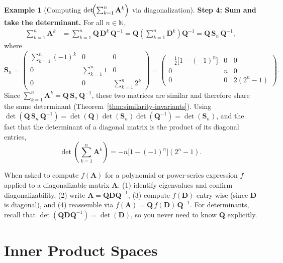 \documentclass[11pt, a4paper, notitlepage]{report}
\theoremstyle{definition}
\newtheorem{example}[theorem]{Example}
\theoremstyle{remark}
\begin{document}
\begin{example}[Computing $\det\!\Bigl(\sum_{k=1}^n \mathbf{A}^k\Bigr)$ via diagonalization]
\medskip
\textbf{Step 4: Sum and take the determinant.}
For all $n \in \mathbb{N}$,
\begin{align*}
  \sum_{k=1}^{n} \mathbf{A}^k
  &= \sum_{k=1}^{n} \mathbf{Q}\,\mathbf{D}^k\,\mathbf{Q}^{-1}
   = \mathbf{Q} \!\left(\sum_{k=1}^{n} \mathbf{D}^k\right)\! \mathbf{Q}^{-1}
   = \mathbf{Q}\,\mathbf{S}_n\,\mathbf{Q}^{-1},
\end{align*}
where
\[
  \mathbf{S}_n
  = \begin{pmatrix}
      \displaystyle\sum_{k=1}^{n}(-1)^k & 0 & 0 \\[6pt]
      0 & \displaystyle\sum_{k=1}^{n}1 & 0 \\[6pt]
      0 & 0 & \displaystyle\sum_{k=1}^{n}2^k
    \end{pmatrix}
  = \begin{pmatrix}
      -\tfrac{1}{2}\bigl[1-(-1)^n\bigr] & 0 & 0 \\[4pt]
      0 & n & 0 \\[4pt]
      0 & 0 & 2(2^n - 1)
    \end{pmatrix}.
\]
Since $\sum_{k=1}^{n} \mathbf{A}^k = \mathbf{Q}\,\mathbf{S}_n\,\mathbf{Q}^{-1}$, these two
matrices are similar and therefore share the same determinant
(Theorem~\ref{thm:similarity-invariants}).  Using
$\det(\mathbf{Q}\,\mathbf{S}_n\,\mathbf{Q}^{-1}) = \det(\mathbf{Q})\det(\mathbf{S}_n)\det(\mathbf{Q}^{-1}) = \det(\mathbf{S}_n)$,
and the fact that the determinant of a diagonal matrix is the product of its diagonal entries,
\[
  \boxed{\det\!\left(\sum_{k=1}^{n}\mathbf{A}^k\right)
  = -n\bigl[1-(-1)^n\bigr](2^n-1).}
\]
\end{example}

\begin{examtip}[title={Exam Tip: Diagonalization for Matrix Powers and Sums}]
When asked to compute $f(\mathbf{A})$ for a polynomial or power-series expression $f$ applied
to a diagonalizable matrix $\mathbf{A}$: (1) identify eigenvalues and confirm diagonalizability,
(2) write $\mathbf{A} = \mathbf{Q}\mathbf{D}\mathbf{Q}^{-1}$, (3) compute $f(\mathbf{D})$
entry-wise (since $\mathbf{D}$ is diagonal), and (4) reassemble via $f(\mathbf{A}) = \mathbf{Q}\,f(\mathbf{D})\,\mathbf{Q}^{-1}$.
For determinants, recall that $\det(\mathbf{Q}\mathbf{D}\mathbf{Q}^{-1}) = \det(\mathbf{D})$,
so you never need to know $\mathbf{Q}$ explicitly.
\end{examtip}

\section{Inner Product Spaces}
\label{sec:ips}
\end{document}
